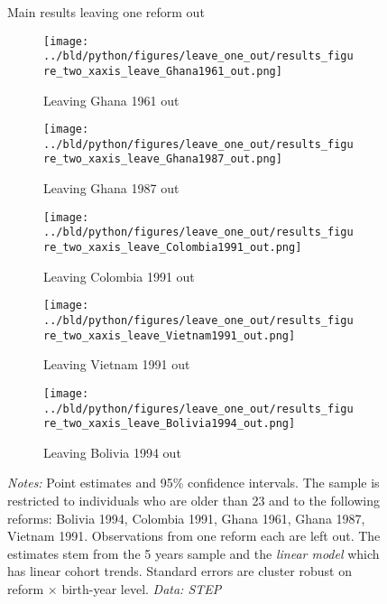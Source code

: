 \begin{figure}
	\centering
	\caption{Main results leaving one reform out}
	\label{fig:leave_one_out}
	\begin{subfigure}{0.45\linewidth}
		\texttt{[image: ../bld/python/figures/leave\_one\_out/results\_figure\_two\_xaxis\_leave\_Ghana1961\_out.png]}
		\caption{Leaving Ghana 1961 out}
		\label{fig:a}
	\end{subfigure}\hfill
	\begin{subfigure}{0.45\linewidth}
		\texttt{[image: ../bld/python/figures/leave\_one\_out/results\_figure\_two\_xaxis\_leave\_Ghana1987\_out.png]}
		\caption{Leaving Ghana 1987 out}
		\label{fig:b}
	\end{subfigure}

	\begin{subfigure}{0.45\linewidth}
		\texttt{[image: ../bld/python/figures/leave\_one\_out/results\_figure\_two\_xaxis\_leave\_Colombia1991\_out.png]}
		\caption{Leaving Colombia 1991 out}
		\label{fig:c}
	\end{subfigure}\hfill
	\begin{subfigure}{0.45\linewidth}
		\texttt{[image: ../bld/python/figures/leave\_one\_out/results\_figure\_two\_xaxis\_leave\_Vietnam1991\_out.png]}
		\caption{Leaving Vietnam 1991 out}
		\label{fig:d}
	\end{subfigure}

	\begin{subfigure}{0.45\linewidth}
		\texttt{[image: ../bld/python/figures/leave\_one\_out/results\_figure\_two\_xaxis\_leave\_Bolivia1994\_out.png]}
		\caption{Leaving Bolivia 1994 out}
		\label{fig:e}
	\end{subfigure}
	\caption*{\footnotesize \textit{Notes:} Point estimates and 95\% confidence intervals. The sample is restricted to individuals who are older than 23 and to the following reforms: Bolivia 1994, Colombia 1991, Ghana 1961, Ghana 1987, Vietnam 1991. Observations from one reform each are left out. The estimates stem from the 5 years sample and the \textit{linear model} which has linear cohort trends. Standard errors are cluster robust on reform $\times$ birth-year level. \textit{Data: STEP}}
\end{figure}



